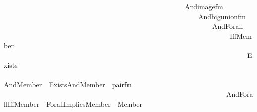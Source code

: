 \begin{isabellebody}
\ \ \ \ \ \ \ \ \ \ \ \ \ \ \ \ \ \ \ \ \ \ \ \ \ \ \ \ \ \ \ \ \ \ \ \ \ \ \ \ \ \ \ \ \ \ \ \ \ \ \ \ And{\isacharparenleft}{\kern0pt}image{\isacharunderscore}{\kern0pt}fm{\isacharparenleft}{\kern0pt}{}{}{\isacharcomma}{\kern0pt}\ {}{\isacharcomma}{\kern0pt}\ {}{\isacharparenright}{\kern0pt}{\isacharcomma}{\kern0pt}\isanewline
\ \ \ \ \ \ \ \ \ \ \ \ \ \ \ \ \ \ \ \ \ \ \ \ \ \ \ \ \ \ \ \ \ \ \ \ \ \ \ \ \ \ \ \ \ \ \ \ \ \ \ \ \ \ \ \ And{\isacharparenleft}{\kern0pt}big{\isacharunderscore}{\kern0pt}union{\isacharunderscore}{\kern0pt}fm{\isacharparenleft}{\kern0pt}{}{\isacharcomma}{\kern0pt}\ {}{\isacharparenright}{\kern0pt}{\isacharcomma}{\kern0pt}\isanewline
\ \ \ \ \ \ \ \ \ \ \ \ \ \ \ \ \ \ \ \ \ \ \ \ \ \ \ \ \ \ \ \ \ \ \ \ \ \ \ \ \ \ \ \ \ \ \ \ \ \ \ \ \ \ \ \ \ \ \ \ And{\isacharparenleft}{\kern0pt}Forall\isanewline
\ \ \ \ \ \ \ \ \ \ \ \ \ \ \ \ \ \ \ \ \ \ \ \ \ \ \ \ \ \ \ \ \ \ \ \ \ \ \ \ \ \ \ \ \ \ \ \ \ \ \ \ \ \ \ \ \ \ \ \ \ \ \ \ \ {\isacharparenleft}{\kern0pt}Iff{\isacharparenleft}{\kern0pt}Member{\isacharparenleft}{\kern0pt}{}{\isacharcomma}{\kern0pt}\ {}{\isacharparenright}{\kern0pt}{\isacharcomma}{\kern0pt}\isanewline
\ \ \ \ \ \ \ \ \ \ \ \ \ \ \ \ \ \ \ \ \ \ \ \ \ \ \ \ \ \ \ \ \ \ \ \ \ \ \ \ \ \ \ \ \ \ \ \ \ \ \ \ \ \ \ \ \ \ \ \ \ \ \ \ \ \ \ \ \ \ Exists\isanewline
\ \ \ \ \ \ \ \ \ \ \ \ \ \ \ \ \ \ \ \ \ \ \ \ \ \ \ \ \ \ \ \ \ \ \ \ \ \ \ \ \ \ \ \ \ \ \ \ \ \ \ \ \ \ \ \ \ \ \ \ \ \ \ \ \ \ \ \ \ \ \ {\isacharparenleft}{\kern0pt}And{\isacharparenleft}{\kern0pt}Member{\isacharparenleft}{\kern0pt}{}{\isacharcomma}{\kern0pt}\ {}{\isacharparenright}{\kern0pt}{\isacharcomma}{\kern0pt}\ Exists{\isacharparenleft}{\kern0pt}And{\isacharparenleft}{\kern0pt}Member{\isacharparenleft}{\kern0pt}{}{\isacharcomma}{\kern0pt}\ {}{}{\isacharparenright}{\kern0pt}{\isacharcomma}{\kern0pt}\ pair{\isacharunderscore}{\kern0pt}fm{\isacharparenleft}{\kern0pt}{}{\isacharcomma}{\kern0pt}\ {}{\isacharcomma}{\kern0pt}\ {}{\isacharparenright}{\kern0pt}{\isacharparenright}{\kern0pt}{\isacharparenright}{\kern0pt}{\isacharparenright}{\kern0pt}{\isacharparenright}{\kern0pt}{\isacharparenright}{\kern0pt}{\isacharparenright}{\kern0pt}{\isacharcomma}{\kern0pt}\isanewline
\ \ \ \ \ \ \ \ \ \ \ \ \ \ \ \ \ \ \ \ \ \ \ \ \ \ \ \ \ \ \ \ \ \ \ \ \ \ \ \ \ \ \ \ \ \ \ \ \ \ \ \ \ \ \ \ \ \ \ \ \ \ \ \ And{\isacharparenleft}{\kern0pt}Forall{\isacharparenleft}{\kern0pt}Iff{\isacharparenleft}{\kern0pt}Member{\isacharparenleft}{\kern0pt}{}{\isacharcomma}{\kern0pt}\ {}{\isacharparenright}{\kern0pt}{\isacharcomma}{\kern0pt}\ Forall{\isacharparenleft}{\kern0pt}Implies{\isacharparenleft}{\kern0pt}Member{\isacharparenleft}{\kern0pt}{}{\isacharcomma}{\kern0pt}\ {}{\isacharparenright}{\kern0pt}{\isacharcomma}{\kern0pt}\ Member{\isacharparenleft}{\kern0pt}{}{\isacharcomma}{\kern0pt}\ {}{\isacharparenright}{\kern0pt}{\isacharparenright}{\kern0pt}{\isacharparenright}{\kern0pt}{\isacharparenright}{\kern0pt}{\isacharparenright}{\kern0pt}{\isacharcomma}{\kern0pt}\isanewline

\end{isabellebody}
